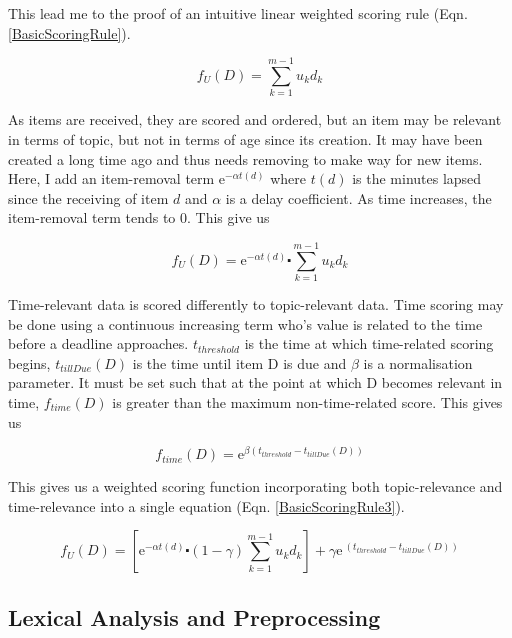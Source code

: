 This lead me to the proof of an intuitive linear weighted scoring rule (Eqn. \ref{BasicScoringRule}).

\begin{equation}\label{BasicScoringRule}
f_U (D) = \sum_{k=1}^{m-1} u_kd_k
\end{equation}

As items are received, they are scored and ordered, but an item may be relevant in terms of topic, but not in terms of age since its creation. It may have been created a long time ago and thus needs removing to make way for new items. Here, I add an item-removal term ${\mathrm{e}}^{-\alpha t(d)}$ where $t(d)$ is the minutes lapsed since the receiving of item $d$ and $\alpha$ is a delay coefficient. As time increases, the item-removal term tends to 0. This give us

\begin{equation}\label{BasicScoringRule2}
	f_U (D) = {\mathrm{e}}^{-\alpha t(d)} \centerdot \sum_{k=1}^{m-1} u_kd_k
\end{equation}

Time-relevant data is scored differently to topic-relevant data. Time scoring may be done using a continuous increasing term who's value is related to the time before a deadline approaches. $t_{threshold}$ is the time at which time-related scoring begins, $t_{tillDue}(D)$ is the time until item D is due and $\beta$ is a normalisation parameter. It must be set such that at the point at which D becomes relevant in time, $f_{time}(D)$ is greater than the maximum non-time-related score. This gives us

\begin{equation}\label{BasicTimeScoringRule}
	f_{time} (D) = {\mathrm{e}}^{\beta (t_{threshold}-t_{tillDue}(D))}
\end{equation}

This gives us a weighted scoring function incorporating both topic-relevance and time-relevance into a single equation (Eqn. \ref{BasicScoringRule3}).

\begin{equation}\label{BasicScoringRule3}
	f_U (D) = \left[{\mathrm{e}}^{-\alpha t(d)} \centerdot (1-\gamma) \sum_{k=1}^{m-1} u_kd_k \right] + \gamma{\mathrm{e}}^{\ (t_{threshold}-t_{tillDue}(D))}
\end{equation}

\subsection{Lexical Analysis and Preprocessing}

